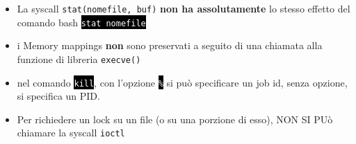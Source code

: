 \documentclass[12pt, letterpaper]{article}
\newcommand{\code}[1]{\colorbox{light-gray}{\texttt{#1}}}
\newcommand{\shelll}[1]{\colorbox{black}{\textcolor{white}{\texttt{#1}}}}
\begin{document}
\begin{itemize}
\begin{center}
    \end{center}
    \item La syscall \code{stat(nomefile, buf)} \textbf{non ha assolutamente}  lo stesso effetto del comando bash \shelll{stat nomefile}
    \item i Memory mappings \textbf{non} sono preservati a seguito di una chiamata alla funzione di libreria \code{execve()}
    \item nel comando \shelll{kill}, con l'opzione \shelll{\%} si può specificare un job id, senza opzione, si specifica un PID.
    \item Per richiedere un lock su un file (o su una porzione di esso), NON SI PUò chiamare la syscall \code{ioctl}
\end{itemize}
\end{document}
